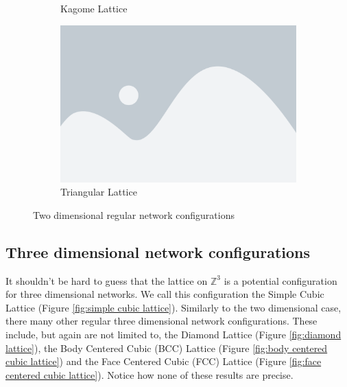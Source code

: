 \begin{figure}[p]
\begin{subfigure}[b]{0.45\textwidth}
    \caption{Kagome Lattice}
    \label{fig:kagome lattice}
  \end{subfigure}
  \hfill
  \begin{subfigure}[b]{0.45\textwidth}
    \centering
    \includegraphics[width=\textwidth]{placeholder}
    \caption{Triangular Lattice}
    \label{fig:triangular lattice}
  \end{subfigure}
  \caption{Two dimensional regular network configurations}
  \label{fig:two dimensional networks}
\end{figure}

\subsection*{Three dimensional network configurations}
It shouldn't be hard to guess that the lattice on $\mathbb{Z}^3$ is a potential configuration for three dimensional networks. We call this configuration the Simple Cubic Lattice (Figure
\ref{fig:simple cubic lattice}). Similarly to
the two dimensional case, there many other regular three dimensional network configurations. These include, but again are not limited to, the Diamond Lattice (Figure
\ref{fig:diamond lattice}), the Body Centered Cubic (BCC) Lattice (Figure \ref{fig:body centered cubic lattice}) and the Face Centered Cubic (FCC) Lattice (Figure \ref{fig:face
centered cubic lattice}). Notice how none of these results are precise. \cite[p. 11]{Sahimi}

